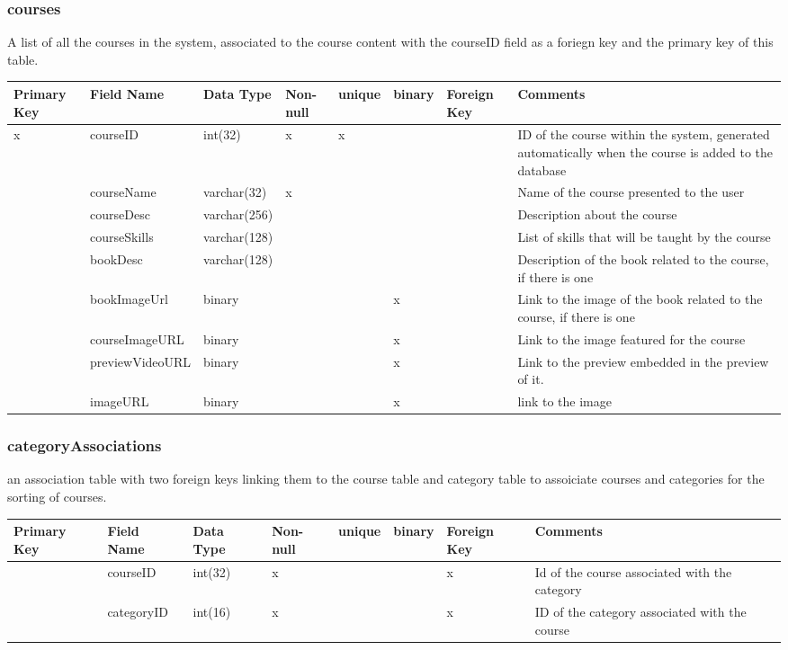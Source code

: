 \documentclass{article}
\begin{document}
\subsubsection{courses}
A list of all the courses in the system, associated to the course content with the courseID field as a foriegn key and the primary key of this table.\\
\begin{tabular}{|m{1cm} | m{2.75cm} | m{2cm}| m{1cm} | m{1cm}| m{1cm} | m{1cm}| m{3cm}| }
  \hline
  Primary Key & Field Name & Data Type & Non-null & unique & binary & Foreign Key & Comments\\ 
  \hline
  x & courseID & int(32) & x & x & & & ID of the course within the system, generated automatically when the course is added to the database\\
  \hline
   & courseName & varchar(32) & x & & & & Name of the course presented to the user\\
  \hline
   & courseDesc & varchar(256) & & & & & Description about the course\\
  \hline
   & courseSkills & varchar(128) & & & & & List of skills that will be taught by the course\\
  \hline
   & bookDesc & varchar(128) & & & & & Description of the book related to the course, if there is one\\
  \hline
   & bookImageUrl & binary & & & x & & Link to the image of the book related to the course, if there is one\\
  \hline
   & courseImageURL & binary & & & x & & Link to the image featured for the course\\
  \hline
   & previewVideoURL & binary & & & x & & Link to the preview embedded in the preview of it.\\
  \hline
   & imageURL & binary & & & x & & link to the image\\
  \hline
\end{tabular}

\subsubsection{categoryAssociations}
an association table with two foreign keys linking them to the course table and category table to assoiciate courses and categories for the sorting of courses. \\
\begin{tabular}{|m{1cm} | m{2cm} | m{1.5cm}| m{1cm} | m{1cm}| m{1cm} | m{1cm}| m{4cm}| }
  \hline
  Primary Key & Field Name & Data Type & Non-null & unique & binary & Foreign Key & Comments\\ 
  \hline
   & courseID & int(32) & x & & & x & Id of the course associated with the category\\
  \hline
   & categoryID & int(16) & x & & & x & ID of the category associated with the course\\
  \hline
\end{tabular}
\end{document}
